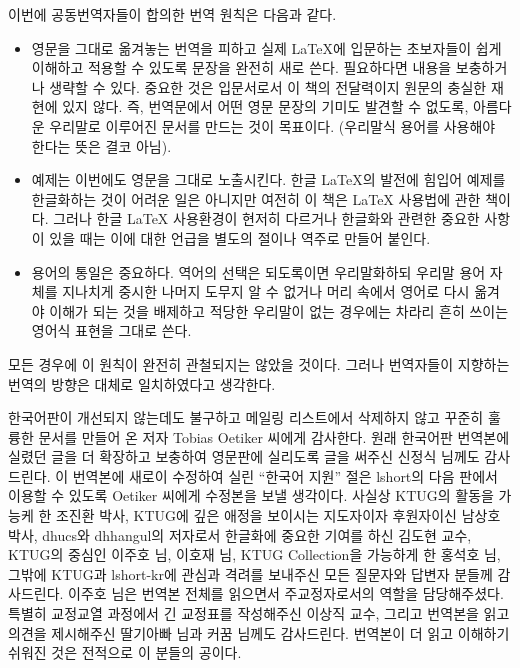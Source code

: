이번에 공동번역자들이 합의한 번역 원칙은 다음과 같다.
\begin{itemize}
\item 영문을 그대로 옮겨놓는 번역을 피하고 실제 \LaTeX 에 입문하는 초보자들이 쉽게 이해하고 적용할 수 있도록
    문장을 완전히 새로 쓴다. 필요하다면 내용을 보충하거나 생략할 수 있다. 중요한 것은 입문서로서 이 책의
    전달력이지 원문의 충실한 재현에 있지 않다. 즉, 번역문에서 어떤 영문 문장의 기미도 발견할 수 없도록,
    아름다운 우리말로 이루어진 문서를 만드는 것이 목표이다. (우리말식 용어를 사용해야 한다는 뜻은 결코
    아님).

\item 예제는 이번에도 영문을 그대로 노출시킨다. 한글 \LaTeX 의 발전에 힘입어 예제를 한글화하는 것이 어려운
    일은 아니지만 여전히 이 책은 \LaTeX{} 사용법에 관한 책이다.
    그러나 한글 \LaTeX{} 사용환경이 현저히 다르거나 한글화와 관련한 중요한 사항이 있을 때는
    이에 대한 언급을 별도의 절이나 역주로 만들어 붙인다.

\item 용어의 통일은 중요하다. 역어의 선택은 되도록이면 우리말화하되 우리말 용어 자체를 지나치게 중시한 나머지
    도무지 알 수 없거나 머리 속에서 영어로 다시 옮겨야 이해가 되는 것을 배제하고 적당한 우리말이 없는
    경우에는 차라리 흔히 쓰이는 영어식 표현을 그대로 쓴다.
    
\end{itemize}

모든 경우에 이 원칙이 완전히 관철되지는 않았을 것이다. 그러나 번역자들이 지향하는
번역의 방향은 대체로 일치하였다고 생각한다. 

한국어판이 개선되지 않는데도 불구하고 메일링 리스트에서 삭제하지 않고
꾸준히 훌륭한 문서를 만들어 온 저자 Tobias Oetiker 씨에게 감사한다. 
원래 한국어판 번역본에 실렸던 글을 더 확장하고 보충하여 영문판에 실리도록
글을 써주신 신정식 님께도 감사드린다. 이 번역본에 새로이 수정하여 실린
``한국어 지원'' 절은 lshort의 다음 판에서 이용할 수 있도록 Oetiker 씨에게
수정본을 보낼 생각이다.
사실상 KTUG의 활동을 가능케 한 조진환 박사, KTUG에 깊은 애정을 보이시는
지도자이자 후원자이신 남상호 박사, dhucs와 dhhangul의 저자로서 한글화에
중요한 기여를 하신 김도현 교수, KTUG의 중심인 이주호 님, 이호재 님,
KTUG Collection을 가능하게 한 홍석호 님, 그밖에 KTUG과 lshort-kr에
관심과 격려를 보내주신 모든 질문자와 답변자 분들께 감사드린다. 이주호 님은
번역본 전체를 읽으면서 주교정자로서의 역할을 담당해주셨다.
특별히 교정\cntrdot 교열 과정에서 긴 교정표를 작성해주신 이상직 교수, 그리고 
번역본을 읽고 의견을 제시해주신 딸기아빠 님과 커꿈 님께도 감사드린다.
번역본이 더 읽고 이해하기 쉬워진 것은 전적으로 이 분들의 공이다.

